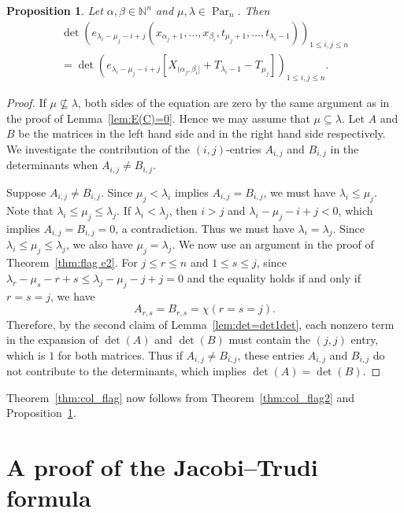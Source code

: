 \documentclass[12pt]{amsart}
\numberwithin{equation}{section}
\newtheorem{prop}[thm]{Proposition}
\theoremstyle{definition}
\newcommand\NN{\mathbb{N}}
\newcommand\Par{\operatorname{Par}}
\begin{document}
\begin{prop}\label{prop:equivalence}
  Let $\alpha,\beta\in\NN^n$ and $\mu,\lambda\in\Par_n$. Then
  \begin{multline*}
\det \left(
    e_{\lambda_i-\mu_j-i+j}(x_{\alpha_j+1},\dots, x_{\beta_i},t_{\mu_j+1},\dots,t_{\lambda_i-1})
  \right)_{1\le i,j\le n}     \\
  = \det \left(
    e_{\lambda_i-\mu_j-i+j}[X_{(\alpha_j,\beta_i]}+T_{\lambda_i-1}-T_{\mu_j}]
  \right)_{1\le i,j\le n}.
  \end{multline*}
\end{prop}
\begin{proof}
  If $\mu\not\subseteq\lambda$, both sides of the equation are zero by the same
  argument as in the proof of Lemma~\ref{lem:E(C)=0}. Hence we may assume that
  $\mu\subseteq\lambda$. Let $A$ and $B$ be the matrices in the left hand side
  and in the right hand side respectively. We investigate the contribution of
  the $(i,j)$-entries $A_{i,j}$ and $B_{i,j}$ in the determinants when
  $A_{i,j}\ne B_{i,j}$.

  Suppose $A_{i,j}\ne B_{i,j}$. Since $\mu_j<\lambda_i$ implies $A_{i,j}=
  B_{i,j}$, we must have $\lambda_i\le \mu_j$. Note that $\lambda_i\le \mu_j\le
  \lambda_j$. If $\lambda_i<\lambda_j$, then $i>j$ and $\lambda_i-\mu_j-i+j<0$,
  which implies $A_{i,j}=B_{i,j}=0$, a contradiction. Thus we must have
  $\lambda_i=\lambda_j$. Since $\lambda_i\le \mu_j\le \lambda_j$, we also have
  $\mu_j=\lambda_j$. We now use an argument in the proof of
  Theorem~\ref{thm:flag e2}. For $j\le r\le n$ and $1\le s\le j$, since
  $\lambda_r-\mu_s-r+s\le \lambda_j-\mu_j-j+j=0$ and the equality holds if and
  only if $r=s=j$, we have
\[
A_{r,s} = B_{r,s} = \chi(r=s=j).
\]
Therefore, by the second claim of Lemma~\ref{lem:det=det1det}, each nonzero term
in the expansion of $\det(A)$ and $\det(B)$ must contain the $(j,j)$ entry,
which is $1$ for both matrices. Thus if $A_{i,j}\ne B_{i,j}$, these entries
$A_{i,j}$ and $B_{i,j}$ do not contribute to the determinants, which implies
$\det(A)=\det(B)$.
\end{proof}

Theorem~\ref{thm:col_flag} now follows from Theorem~\ref{thm:col_flag2} and
Proposition~\ref{prop:equivalence}.


\section{A proof of the Jacobi--Trudi formula}
\label{sec:proof-jacobi-trudi2}
\end{document}
